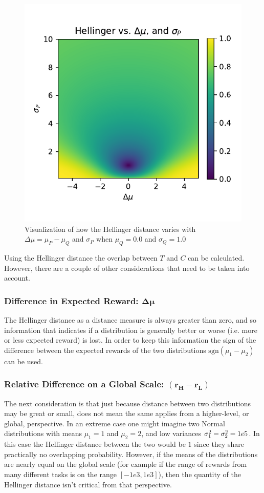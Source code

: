 \begin{figure}[tbp]
    \centering
    \includegraphics[width=0.9\linewidth]{Figures/hellinger_surf}
    \caption{Visualization of how the Hellinger distance varies with $\Delta\mu=\mu_P-\mu_Q$ and $\sigma_P$ when $\mu_Q=0.0$ and $\sigma_Q=1.0$}
    \label{fig:hellinger_surf}
\end{figure}

Using the Hellinger distance the overlap between $T$ and $C$ can be calculated. However, there are a couple of other considerations that need to be taken into account. 

\subsubsection{Difference in Expected Reward: $\pmb{\Delta \mu}$}
The Hellinger distance as a distance measure is always greater than zero, and so information that indicates if a distribution is generally better or worse (i.e. more or less expected reward) is lost. In order to keep this information the sign of the difference between the expected rewards of the two distributions $\text{sgn}(\mu_1-\mu_2)$ can be used.

\subsubsection{Relative Difference on a Global Scale: $\pmb{(r_H-r_L)}$}
The next consideration is that just because distance between two distributions may be great or small, does not mean the same applies from a higher-level, or global, perspective. In an extreme case one might imagine two Normal distributions with means $\mu_1=1$ and $\mu_2=2$, and low variances $\sigma_1^2=\sigma_2^2=1e\-5$. In this case the Hellinger distance between the two would be $1$ since they share practically no overlapping probability. However, if the means of the distributions are nearly equal on the global scale (for example if the range of rewards from many different tasks is on the range $[-1e3,1e3]$), then the quantity of the Hellinger distance isn't critical from that perspective.

